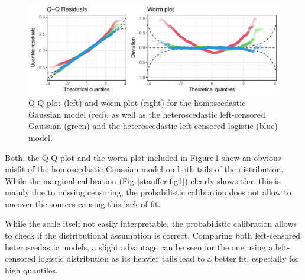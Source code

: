 \documentclass[twoside]{report}
\begin{document}
\begin{figure}[!ht]\centering
    \includegraphics[width=\textwidth]{Stauffer-qqresiduals}
    \caption{\label{stauffer:fig2} 
        Q-Q plot (left) and worm plot (right) for the homoscedastic
        Gaussian model (red), as well as the heteroscedastic left-censored
        Gaussian (green) and the heteroscedastic left-censored logistic (blue) model.
    }
\end{figure}

Both, the Q-Q plot and the worm plot included in Figure\,\ref{stauffer:fig2} show an
obvious misfit of the homoscedastic Gaussian model on both tails of the
distribution. While the marginal calibration (Fig.\,\ref{stauffer:fig1})
clearly shows that this is mainly due to missing censoring, the probabilistic
calibration does not allow to uncover the sources causing this lack of fit.

While the scale itself not easily interpretable, the probabilistic calibration
allows to check if the distributional assumption is correct.  Comparing both
left-censored heteroscedastic models, a slight advantage can be seen for the
one using a left-censored logistic distribution as its heavier tails lead to a
better fit, especially for high quantiles.


\end{document}
